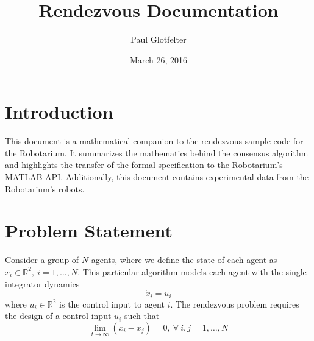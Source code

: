 \documentclass{article}
\title{Rendezvous Documentation}
\author{Paul Glotfelter}
\date{March 26, 2016}
\begin{document}
\maketitle

\section{Introduction}

This document is a mathematical companion to the rendezvous sample code for the Robotarium.  It summarizes the mathematics behind the consensus algorithm and highlights the transfer of the formal specification to the Robotarium's MATLAB API.  Additionally, this document contains experimental data from the Robotarium's robots. 

\section{Problem Statement} 

Consider a group of $N$ agents, where we define the state of each agent as $x_{i} \in \mathds{R}^{2},~ i = 1,\hdots,N$.  This particular algorithm models each agent with the single-integrator dynamics
\[
\dot{x}_{i} = u_{i}
\]
where $u_{i} \in \mathds{R}^{2}$ is the control input to agent $i$.  The rendezvous problem requires the design of a control input $u_{i}$ such that 
\begin{equation}
    \lim_{t \to \infty} (x_{i} - x_{j}) = 0, ~ \forall ~ i,j = 1,\hdots,N
    \label{eq:solution}
\end{equation}
\end{document}
